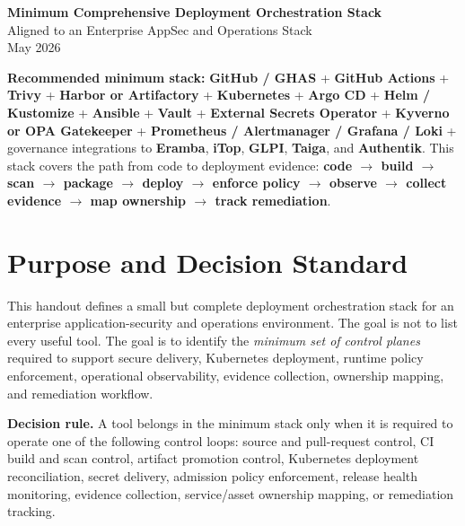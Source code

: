 \documentclass[10pt,letterpaper]{article}
\newcommand{\tool}[1]{\textbf{#1}}
\begin{document}
\begin{center}
  {\LARGE\bfseries\color{Navy} Minimum Comprehensive Deployment Orchestration Stack}\\[3pt]
  {\large\color{GrayText} Aligned to an Enterprise AppSec and Operations Stack}\\[6pt]
  {\normalsize May 2026}
\end{center}

\begin{summarybox}
\textbf{Recommended minimum stack:} \tool{GitHub / GHAS} + \tool{GitHub Actions} + \tool{Trivy} + \tool{Harbor or Artifactory} + \tool{Kubernetes} + \tool{Argo CD} + \tool{Helm / Kustomize} + \tool{Ansible} + \tool{Vault} + \tool{External Secrets Operator} + \tool{Kyverno or OPA Gatekeeper} + \tool{Prometheus / Alertmanager / Grafana / Loki} + governance integrations to \tool{Eramba}, \tool{iTop}, \tool{GLPI}, \tool{Taiga}, and \tool{Authentik}. This stack covers the path from code to deployment evidence: \textbf{code \(\rightarrow\) build \(\rightarrow\) scan \(\rightarrow\) package \(\rightarrow\) deploy \(\rightarrow\) enforce policy \(\rightarrow\) observe \(\rightarrow\) collect evidence \(\rightarrow\) map ownership \(\rightarrow\) track remediation}.
\end{summarybox}

\section{Purpose and Decision Standard}

This handout defines a small but complete deployment orchestration stack for an enterprise application-security and operations environment. The goal is not to list every useful tool. The goal is to identify the \emph{minimum set of control planes} required to support secure delivery, Kubernetes deployment, runtime policy enforcement, operational observability, evidence collection, ownership mapping, and remediation workflow.

\begin{decisionbox}
\textbf{Decision rule.} A tool belongs in the minimum stack only when it is required to operate one of the following control loops: source and pull-request control, CI build and scan control, artifact promotion control, Kubernetes deployment reconciliation, secret delivery, admission policy enforcement, release health monitoring, evidence collection, service/asset ownership mapping, or remediation tracking.
\end{decisionbox}
\end{document}
